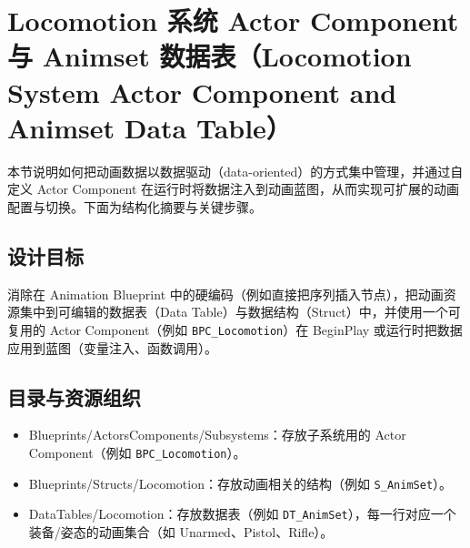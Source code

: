 \documentclass[10pt,CJKmath]{zhbook-v1}
\newcommand{\il}[1]{\texttt{#1}}%
\begin{document}
\section{Locomotion 系统 Actor Component 与 Animset 数据表（Locomotion System Actor Component and Animset Data Table）}

本节说明如何把动画数据以数据驱动（data-oriented）的方式集中管理，并通过自定义 Actor Component 在运行时将数据注入到动画蓝图，从而实现可扩展的动画配置与切换。下面为结构化摘要与关键步骤。

\subsection{设计目标}
消除在 Animation Blueprint 中的硬编码（例如直接把序列插入节点），把动画资源集中到可编辑的数据表（Data Table）与数据结构（Struct）中，并使用一个可复用的 Actor Component（例如 \il{BPC_Locomotion}）在 BeginPlay 或运行时把数据应用到蓝图（变量注入、函数调用）。

\subsection{目录与资源组织}
\begin{itemize}
  \item Blueprints/ActorsComponents/Subsystems：存放子系统用的 Actor Component（例如 \il{BPC_Locomotion}）。
  \item Blueprints/Structs/Locomotion：存放动画相关的结构（例如 \il{S_AnimSet}）。
  \item DataTables/Locomotion：存放数据表（例如 \il{DT_AnimSet}），每一行对应一个装备/姿态的动画集合（如 Unarmed、Pistol、Rifle）。
\end{itemize}
\end{document}
